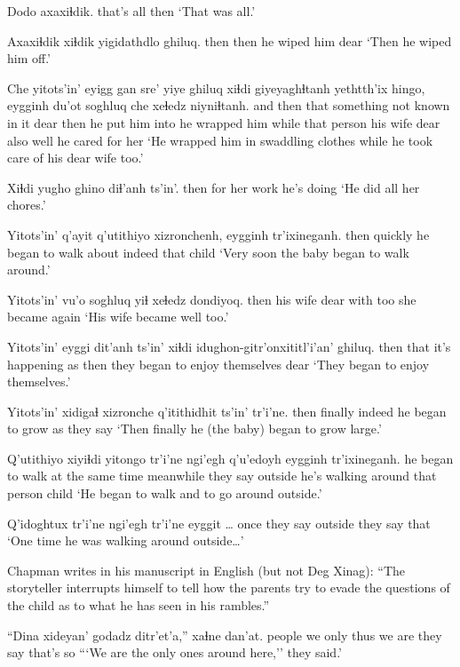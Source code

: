 \documentclass[12pt]{article}
\begin{document}
\gll Dodo  axaxiɬdik.
{that's all} then
\glt `That was all.'
\glend

\gll Axaxiɬdik xiɬdik  yigidathdlo ghiluq.
then  then  {he wiped him} dear
\glt `Then he wiped him off.'
\glend

\gll Che yitots'in' eyigg gan sre' yiye ghiluq xiɬdi giyeyaghɬtanh yethtth'ix  hingo, eygginh du'ot  soghluq che xeɬedz niyniɬtanh.
and then  that something {not known} {in it} dear then {he put him into} {he wrapped him} while {that person} {his wife} dear also well {he cared for her}
\glt `He wrapped him in swaddling clothes while he took care of his dear wife too.'
\glend

\gll Xiɬdi yugho ghino diɬ'anh ts'in'.
then {for her} work {he's doing} 
\glt `He did all her chores.'
\glend

\gll Yitots'in' q'ayit q'utithiyo  xizronchenh, eygginh tr'ixineganh.
then  quickly  {he began to walk about} indeed that child
\glt `Very soon the baby began to walk around.'
\glend

\gll Yitots'in' vu'o  soghluq yiɬ xeɬedz dondiyoq.
then  {his wife} dear  with too  {she became again}
\glt `His wife became well too.'
\glend

\gll Yitots'in' eyggi dit'anh ts'in' xiɬdi idughon-gitr'onxititl'i'an' ghiluq.
then  that {it's happening} as then {they began to enjoy themselves} dear
\glt `They began to enjoy themselves.'
\glend

\gll Yitots'in' xidigaɬ xizronche q'itithidhit  ts'in' tr'i'ne.
then finally indeed {he began to grow} as {they say}
\glt `Then finally he (the baby) began to grow large.'
\glend

\gll Q'utithiyo  xiyiɬdi  yitongo tr'i'ne ngi'egh q'u'edoyh eygginh tr'ixineganh.
{he began to walk} {at the same time} meanwhile {they say} outside {he's walking around} {that person} child
\glt `He began to walk and to go around outside.'
\glend

\gll Q'idoghtux tr'i'ne ngi'egh tr'i'ne eyggit \ldots
once {they say} outside {they say} that
\glt `One time he was walking around outside\ldots'
\glend

Chapman writes in his manuscript in English (but not Deg Xinag): ``The storyteller interrupts himself
to tell how the parents try to evade the questions of the child as to what he has seen in his rambles.''

\gll ``Dina xideyan' godadz ditr'et'a,'' xaɬne  dan'at.
people {we only}  thus {we are} {they say} {that's so}
\glt ```We are the only ones around here,'' they said.'
\glend
\end{document}

